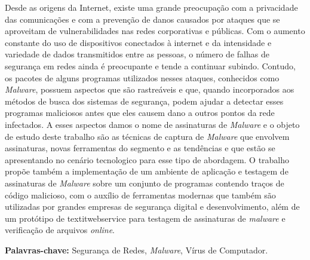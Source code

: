 \documentclass[
	12pt,				%
	openright,			%
	oneside,			%
	a4paper,			%
	english,			%
	french,				%
	spanish,			%
	brazil				%
	]{abntex2}
\begin{document}
\setlength{\absparsep}{18pt} %
\begin{resumo}

Desde as origens da Internet, existe uma grande preocupação com a privacidade das comunicações e com a prevenção de danos causados por ataques que se aproveitam de vulnerabilidades nas redes corporativas e públicas. Com o aumento constante do uso de dispositivos conectados à internet e da intensidade e variedade de dados transmitidos entre as pessoas, o número de falhas de segurança em redes ainda é preocupante e tende a continuar subindo. Contudo, os pacotes de alguns programas utilizados nesses ataques, conhecidos como \textit{Malware}, possuem aspectos que são rastreáveis e que, quando incorporados aos métodos de busca dos sistemas de segurança, podem ajudar a detectar esses programas maliciosos antes que eles causem dano a outros pontos da rede infectados. A esses aspectos damos o nome de assinaturas de \textit{Malware} e o objeto de estudo deste trabalho são as técnicas de captura de \textit{Malware} que envolvem assinaturas, novas ferramentas do segmento e as tendências e que estão se apresentando no cenário tecnologico para esse tipo de abordagem. O trabalho propõe também a implementação de um ambiente de aplicação e testagem de assinaturas de \textit{Malware} sobre um conjunto de programas contendo traços de código malicioso, com o auxílio de ferramentas modernas que também são utilizadas por grandes empresas de segurança digital e desenvolvimento, além de um protótipo de textit{webservice} para testagem de assinaturas de \textit{malware} e verificação de arquivos \textit{online}.

\textbf{Palavras-chave:} Segurança de Redes, \textit{Malware}, Vírus de Computador.
\end{resumo}
\end{document}
